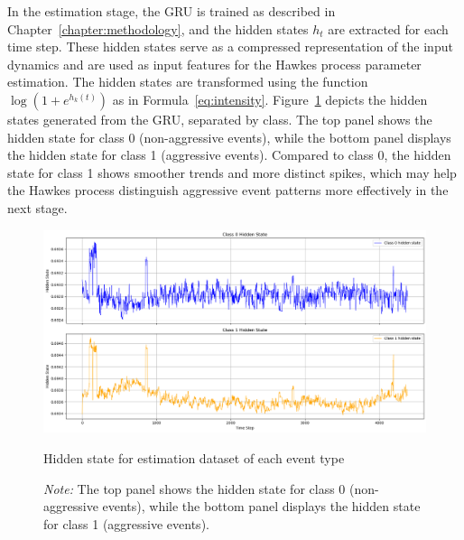 In the estimation stage, the GRU is trained as described in Chapter~\ref{chapter:methodology}, and the hidden states $h_t$ are extracted for each time step. These hidden states serve as a compressed representation of the input dynamics and are used as input features for the Hawkes process parameter estimation. The hidden states are transformed using the function $\log(1 + e^{h_k(t)})$ as in Formula~\ref{eq:intensity}. Figure~\ref{fig:train-hidden-state} depicts the hidden states generated from the GRU, separated by class. The top panel shows the hidden state for class 0 (non-aggressive events), while the bottom panel displays the hidden state for class 1 (aggressive events). Compared to class 0, the hidden state for class 1 shows smoother trends and more distinct spikes, which may help the Hawkes process distinguish aggressive event patterns more effectively in the next stage.

\begin{figure}[H]
    \centering
    \includegraphics[width=0.95\linewidth]{figures/train-hidden-state.png}
    \caption{Hidden state for estimation dataset of each event type}
    \caption*{\textit{Note:} The top panel shows the hidden state for class 0 (non-aggressive events), while the bottom panel displays the hidden state for class 1 (aggressive events).}
    \label{fig:train-hidden-state}
\end{figure}


